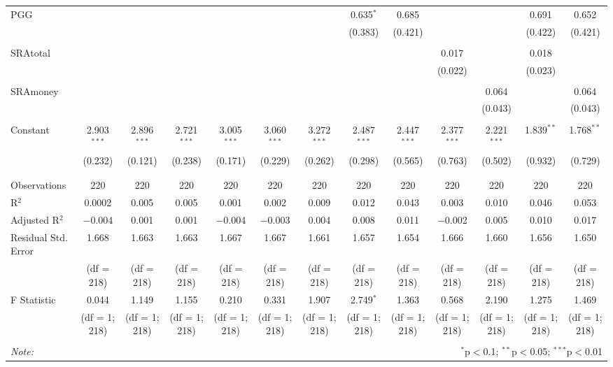 \documentclass[12pt]{article}
\begin{document}
\begin{table}[!htbp]
\begin{adjustbox}{width=\textwidth}
\begin{tabular}{@{\extracolsep{5pt}}lcccccccccccc}
 PGG &  &  &  &  &  &  & 0.635$^{*}$ & 0.685 &  &  & 0.691 & 0.652 \\ 
  &  &  &  &  &  &  & (0.383) & (0.421) &  &  & (0.422) & (0.421) \\ 
  & & & & & & & & & & & & \\ 
 SRAtotal &  &  &  &  &  &  &  &  & 0.017 &  & 0.018 &  \\ 
  &  &  &  &  &  &  &  &  & (0.022) &  & (0.023) &  \\ 
  & & & & & & & & & & & & \\ 
 SRAmoney &  &  &  &  &  &  &  &  &  & 0.064 &  & 0.064 \\ 
  &  &  &  &  &  &  &  &  &  & (0.043) &  & (0.043) \\ 
  & & & & & & & & & & & & \\ 
 Constant & 2.903$^{***}$ & 2.896$^{***}$ & 2.721$^{***}$ & 3.005$^{***}$ & 3.060$^{***}$ & 3.272$^{***}$ & 2.487$^{***}$ & 2.447$^{***}$ & 2.377$^{***}$ & 2.221$^{***}$ & 1.839$^{**}$ & 1.768$^{**}$ \\ 
  & (0.232) & (0.121) & (0.238) & (0.171) & (0.229) & (0.262) & (0.298) & (0.565) & (0.763) & (0.502) & (0.932) & (0.729) \\ 
  & & & & & & & & & & & & \\ 
\hline \\[-1.8ex] 
Observations & 220 & 220 & 220 & 220 & 220 & 220 & 220 & 220 & 220 & 220 & 220 & 220 \\ 
R$^{2}$ & 0.0002 & 0.005 & 0.005 & 0.001 & 0.002 & 0.009 & 0.012 & 0.043 & 0.003 & 0.010 & 0.046 & 0.053 \\ 
Adjusted R$^{2}$ & $-$0.004 & 0.001 & 0.001 & $-$0.004 & $-$0.003 & 0.004 & 0.008 & 0.011 & $-$0.002 & 0.005 & 0.010 & 0.017 \\ 
Residual Std. Error & 1.668 & 1.663 & 1.663 & 1.667 & 1.667 & 1.661 & 1.657 & 1.654 & 1.666  & 1.660 & 1.656  & 1.650 \\ 
& (df = 218) & (df = 218) & (df = 218) & (df = 218) & (df = 218) & (df = 218) & (df = 218) & (df = 218) & (df = 218) & (df = 218) & (df = 218) & (df = 218) \\
F Statistic & 0.044 & 1.149  & 1.155 & 0.210  & 0.331 & 1.907 & 2.749$^{*}$ & 1.363 & 0.568 & 2.190 & 1.275  & 1.469 \\ 
& (df = 1; 218) & (df = 1; 218) & (df = 1; 218) & (df = 1; 218) & (df = 1; 218) & (df = 1; 218) & (df = 1; 218) & (df = 1; 218) & (df = 1; 218) & (df = 1; 218) & (df = 1; 218) & (df = 1; 218) \\
\hline 
\hline \\[-1.8ex] 
\textit{Note:}  & \multicolumn{12}{r}{$^{*}$p$<$0.1; $^{**}$p$<$0.05; $^{***}$p$<$0.01} \\ 
\end{tabular} 
\end{adjustbox}
\end{table} 
\end{document}
